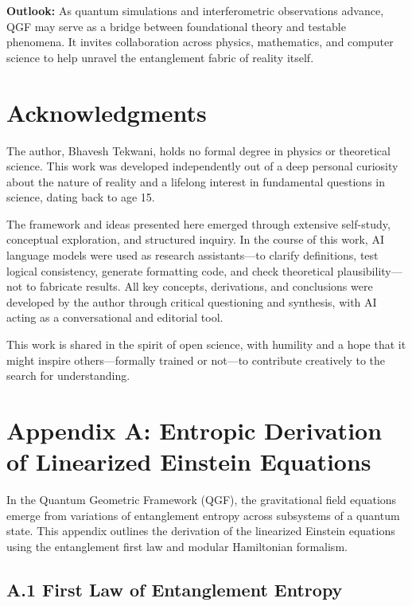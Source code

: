 \documentclass[11pt]{article}
\begin{document}
\textbf{Outlook:} As quantum simulations and interferometric observations advance, QGF may serve as a bridge between foundational theory and testable phenomena. It invites collaboration across physics, mathematics, and computer science to help unravel the entanglement fabric of reality itself.


\section*{Acknowledgments}

The author, Bhavesh Tekwani, holds no formal degree in physics or theoretical science. This work was developed independently out of a deep personal curiosity about the nature of reality and a lifelong interest in fundamental questions in science, dating back to age 15.

The framework and ideas presented here emerged through extensive self-study, conceptual exploration, and structured inquiry. In the course of this work, AI language models were used as research assistants—to clarify definitions, test logical consistency, generate formatting code, and check theoretical plausibility—not to fabricate results. All key concepts, derivations, and conclusions were developed by the author through critical questioning and synthesis, with AI acting as a conversational and editorial tool.

This work is shared in the spirit of open science, with humility and a hope that it might inspire others—formally trained or not—to contribute creatively to the search for understanding.


\section*{Appendix A: Entropic Derivation of Linearized Einstein Equations}

In the Quantum Geometric Framework (QGF), the gravitational field equations emerge from variations of entanglement entropy across subsystems of a quantum state. This appendix outlines the derivation of the linearized Einstein equations using the entanglement first law and modular Hamiltonian formalism.

\subsection*{A.1 First Law of Entanglement Entropy}
\end{document}
